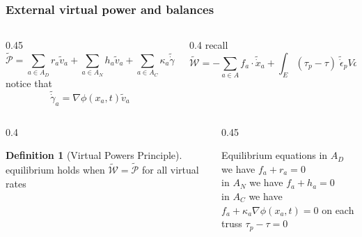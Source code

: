 \documentclass[8pt]{beamer}
\numberwithin{equation}{section}
\theoremstyle{definition}
\newtheorem{defi}[prop]{Definition}
\begin{document}
\begin{frame}
\frametitle{External virtual power and balances}

\begin{columns}
\begin{column}{0.45\framewidth}
\[
\tilde{\mathcal{P}}=\sum_{a\in A_D}r_a\tilde{v}_a+\sum_{a\in A_N}h_a\tilde{v}_a+\sum_{a\in A_C}\kappa_a\tilde{\dot\gamma}_a.
\]
\centering notice that
\[
\tilde{\dot\gamma}_a=\nabla\phi(x_a,t)\tilde{v}_a
\]
\end{column}
\begin{column}{0.4\framewidth}
\centering recall
\[
\tilde{\mathcal{W}}=-\sum_{a\in A}f_a\cdot\tilde{\dot x}_a+\int_E(\tau_p-\tau)\;\tilde{\dot\epsilon}_pVde
\]
\end{column}
\end{columns}

\vfill

\begin{columns}
\begin{column}{0.4\framewidth}
\begin{defi}[Virtual Powers Principle]
equilibrium holds when $\tilde{\mathcal{W}}=\tilde{\mathcal{P}}$ for all virtual rates
\end{defi}
\end{column}
\begin{column}{0.45\framewidth}
\begin{block}{Equilibrium equations}
in $A_D$ we have $f_a+r_a=0$ \\
in $A_N$ we have $f_a+h_a=0$ \\
in $A_C$ we have $f_a+\kappa_a\nabla\phi(x_a,t)=0$
on each truss $\tau_p-\tau=0$
\end{block}
\end{column}
\end{columns}
\end{frame}
\end{document}
